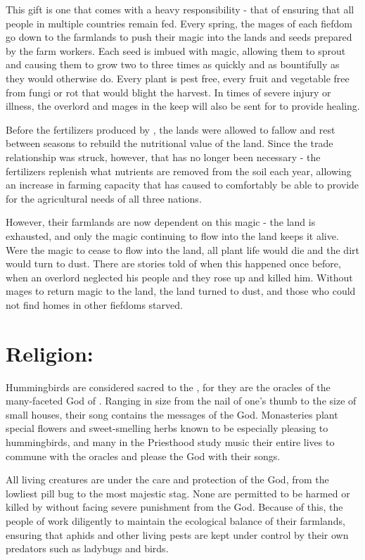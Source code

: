 \documentclass[blue]{GL2020}
\begin{document}
This gift is one that comes with a heavy responsibility - that of ensuring that all people in multiple countries remain fed.  Every spring, the mages of each fiefdom go down to the farmlands to push their magic into the lands and seeds prepared by the farm workers.  Each seed is imbued with magic, allowing them to sprout and causing them to grow two to three times as quickly and as bountifully as they would otherwise do.  Every plant is pest free, every fruit and vegetable free from fungi or rot that would blight the harvest.  In times of severe injury or illness, the overlord and mages in the keep will also be sent for to provide healing.   

Before the fertilizers produced by \pTech{}, the lands were allowed to fallow and rest between seasons to rebuild the nutritional value of the land.  Since the trade relationship was struck, however, that has no longer been necessary - the fertilizers replenish what nutrients are removed from the soil each year, allowing an increase in farming capacity that has caused \pFarm{} to comfortably be able to provide for the agricultural needs of all three nations.

However, their farmlands are now dependent on this magic - the land is exhausted, and only the magic continuing to flow into the land keeps it alive.  Were the magic to cease to flow into the land, all plant life would die and the dirt would turn to dust.  There are stories told of when this happened once before, when an overlord neglected his people and they rose up and killed him.  Without mages to return magic to the land, the land turned to dust, and those who could not find homes in other fiefdoms starved.
 
\section*{Religion:}

Hummingbirds are considered sacred to the \pFarm{}, for they are the oracles of the many-faceted God of \pFarm{}.  Ranging in size from the nail of one's thumb to the size of small houses, their song contains the messages of the God.  Monasteries plant special flowers and sweet-smelling herbs known to be especially pleasing to hummingbirds, and many in the Priesthood study music their entire lives to commune with the oracles and please the God with their songs.

All living creatures are under the care and protection of the God, from the lowliest pill bug to the most majestic stag.  None are permitted to be harmed or killed by \pFarm{} without facing severe punishment from the God.  Because of this, the people of \pFarm{} work diligently to maintain the ecological balance of their farmlands, ensuring that aphids and other living pests are kept under control by their own predators such as ladybugs and birds.  %
\end{document}
